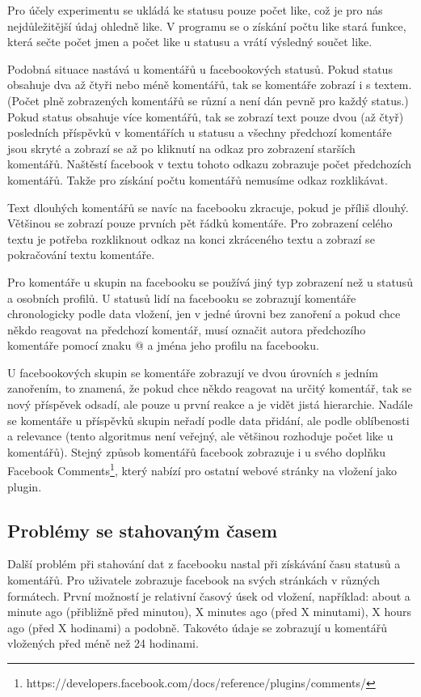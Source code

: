 \documentclass[thesis=M,czech]{FITthesis}[2013/05/10]
\begin{document}
Pro účely experimentu se ukládá ke statusu pouze počet like, což je pro nás nejdůležitější údaj ohledně like. V programu se o získání počtu like stará funkce, která sečte počet jmen a počet like u statusu a vrátí výsledný součet like. 

Podobná situace nastává u komentářů u facebookových statusů. Pokud status obsahuje dva až čtyři nebo méně komentářů, tak se komentáře zobrazí i s textem. (Počet plně zobrazených komentářů se různí a není dán pevně pro každý status.) Pokud status obsahuje  více komentářů, tak se zobrazí text pouze dvou (až čtyř) posledních příspěvků v komentářích u statusu a všechny předchozí komentáře jsou skryté a zobrazí se až po kliknutí na odkaz pro zobrazení starších komentářů. Naštěstí facebook v textu tohoto odkazu zobrazuje počet předchozích komentářů. Takže pro získání počtu komentářů nemusíme odkaz rozklikávat. 

Text dlouhých komentářů se navíc na facebooku zkracuje, pokud je příliš dlouhý. Většinou se zobrazí pouze prvních pět řádků komentáře. Pro zobrazení celého textu je potřeba rozkliknout odkaz na konci zkráceného textu a zobrazí se pokračování textu komentáře. 

Pro komentáře u skupin na facebooku se používá jiný typ zobrazení než u statusů a osobních profilů. U statusů lidí na facebooku se zobrazují komentáře chronologicky podle data vložení, jen v jedné úrovni bez zanoření a pokud chce někdo reagovat na předchozí komentář, musí označit autora předchozího komentáře pomocí znaku @ a jména jeho profilu na facebooku. 

U facebookových skupin se komentáře zobrazují ve dvou úrovních s jedním zanořením, to znamená, že pokud chce někdo reagovat na určitý komentář, tak se nový příspěvek odsadí, ale pouze u první reakce a je vidět jistá hierarchie. Nadále se komentáře u příspěvků skupin neřadí podle data přidání, ale podle oblíbenosti a relevance (tento algoritmus není veřejný, ale většinou rozhoduje počet like u komentářů). Stejný způsob komentářů facebook zobrazuje i u svého doplňku Facebook Comments\footnote{https://developers.facebook.com/docs/reference/plugins/comments/}, který nabízí pro ostatní webové stránky na vložení jako plugin. 

\subsection{Problémy se stahovaným časem}

Další problém při stahování dat z facebooku nastal při získávání času statusů a komentářů. Pro uživatele zobrazuje facebook na svých stránkách v různých formátech. První možností je relativní časový úsek od vložení, například: about a minute ago (přibližně před minutou), X minutes ago (před X minutami), X hours ago (před X hodinami) a podobně. Takovéto údaje se zobrazují u komentářů vložených před méně než 24 hodinami. 
\end{document}
